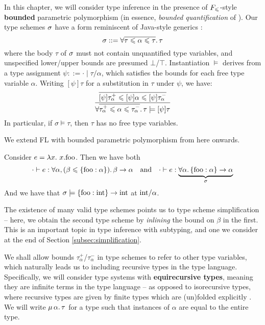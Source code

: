 In this chapter, we will consider type inference in the presence of $F_\leqslant$-style \textbf{bounded} parametric polymorphism (in essence, \emph{bounded quantification} of \textcite{bounded-quantification}). Our type schemes $\sigma$ have a form reminiscent of Java-style generics \cite{generic-java, simple-sub}:
$$ \sigma ::= \forall \overline{\tau \leqslant \alpha \leqslant \tau} \ldotp \tau $$
where the body $\tau$ of $\sigma$ must not contain unquantified type variables, and unspecified lower/upper bounds are presumed $\bot$/$\top$. 
Instantiation $\models$ derives from a type assignment $\psi ::= \cdot \mid \tau/\alpha$, which satisfies the bounds for each free type variable $\alpha$. Writing $[\psi]\tau$ for a substitution in $\tau$ under $\psi$, we have:
$$ \dfrac{\overline{[\psi]\tau_\alpha^+ \sub \substx{\psi} \alpha \sub [\psi]\tau_\alpha^-}}{\forall \overline{\tau_\alpha^+ \sub \alpha \sub \tau_\alpha^-} \ldotp \tau \models \substx{\psi}{\tau}} $$
In particular, if $\sigma \models \tau$, then $\tau$ has no free type variables.

\begin{example}
    We extend FL with bounded parametric polymorphism from here onwards. 

    Consider $e = \lambda {x} \ldotp\, {x}{.}{\mathrm{foo}}$. Then we have both 
    $$ \cdot \vdash e : \forall \alpha, (\beta \sub \flrec{\mathrm{foo} : \alpha}) \ldotp \beta \to \alpha  \quad \text{and} \quad \cdot \vdash e : \underbrace{\forall  \alpha \ldotp \flrec{\mathrm{foo} : \alpha} \to \alpha}_\sigma $$
    And we have that $\sigma \models \flrec{\mathrm{foo} : \sint} \to \sint$ at $\mathrm{int}/\alpha$.
    
    The existence of many valid type schemes points us to type scheme simplification -- here, we obtain the second type scheme by \emph{inlining} the bound on $\beta$ in the first. This is an important topic in type inference with subtyping, and one we consider at the end of Section \ref{subsec:simplification}.
\end{example}

We shall allow bounds $\tau_\alpha^+$/$\tau_\alpha^-$ in type schemes to refer to other type variables, which naturally leads us to including recursive types in the type language.
Specifically, we will consider type systems with \textbf{equirecursive types}, meaning they are infinite terms in the type language -- as opposed to isorecursive types, where recursive types are given by finite types which are (un)folded explicitly \cite{tapl}. We will write $\mu\,{\alpha}\ldotp \tau$ for a type  such that instances of $\alpha$ are equal to the entire type.


